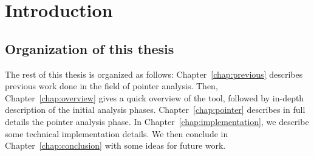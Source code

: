 \chapter{Introduction} \label{chap:intro}
%

\section{Organization of this thesis}
The rest of this thesis is organized as follows: Chapter~\ref{chap:previous}
describes previous work done in the field of pointer analysis.  Then,
Chapter~\ref{chap:overview} gives a quick overview of the tool, followed by
in-depth description of the initial analysis phases.
Chapter~\ref{chap:pointer} describes in full details the pointer analysis
phase.  In Chapter~\ref{chap:implementation}, we describe some technical
implementation details. We then conclude in Chapter~\ref{chap:conclusion} with
some ideas for future work.
